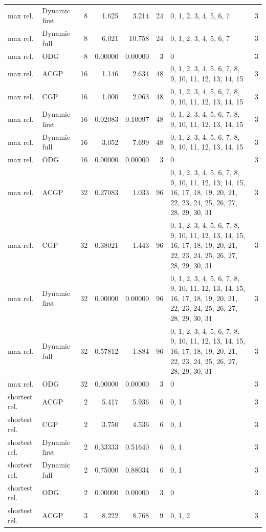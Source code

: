 \documentclass[10pt,a4paper]{article}
\begin{document}
\begin{longtable}{@{}p{23mm}p{29mm}rrrrp{36mm}r@{}}
max rel. & Dynamic first & 8 & 1.625 & 3.214 & 24 & 0, 1, 2, 3, 4, 5, 6, 7 & 3 \\
max rel. & Dynamic full & 8 & 6.021 & 10.758 & 24 & 0, 1, 2, 3, 4, 5, 6, 7 & 3 \\
max rel. & ODG & 8 & 0.00000 & 0.00000 & 3 & 0 & 3 \\
max rel. & ACGP & 16 & 1.146 & 2.634 & 48 & 0, 1, 2, 3, 4, 5, 6, 7, 8, 9, 10, 11, 12, 13, 14, 15 & 3 \\
max rel. & CGP & 16 & 1.000 & 2.063 & 48 & 0, 1, 2, 3, 4, 5, 6, 7, 8, 9, 10, 11, 12, 13, 14, 15 & 3 \\
max rel. & Dynamic first & 16 & 0.02083 & 0.10097 & 48 & 0, 1, 2, 3, 4, 5, 6, 7, 8, 9, 10, 11, 12, 13, 14, 15 & 3 \\
max rel. & Dynamic full & 16 & 3.052 & 7.699 & 48 & 0, 1, 2, 3, 4, 5, 6, 7, 8, 9, 10, 11, 12, 13, 14, 15 & 3 \\
max rel. & ODG & 16 & 0.00000 & 0.00000 & 3 & 0 & 3 \\
max rel. & ACGP & 32 & 0.27083 & 1.033 & 96 & 0, 1, 2, 3, 4, 5, 6, 7, 8, 9, 10, 11, 12, 13, 14, 15, 16, 17, 18, 19, 20, 21, 22, 23, 24, 25, 26, 27, 28, 29, 30, 31 & 3 \\
max rel. & CGP & 32 & 0.38021 & 1.443 & 96 & 0, 1, 2, 3, 4, 5, 6, 7, 8, 9, 10, 11, 12, 13, 14, 15, 16, 17, 18, 19, 20, 21, 22, 23, 24, 25, 26, 27, 28, 29, 30, 31 & 3 \\
max rel. & Dynamic first & 32 & 0.00000 & 0.00000 & 96 & 0, 1, 2, 3, 4, 5, 6, 7, 8, 9, 10, 11, 12, 13, 14, 15, 16, 17, 18, 19, 20, 21, 22, 23, 24, 25, 26, 27, 28, 29, 30, 31 & 3 \\
max rel. & Dynamic full & 32 & 0.57812 & 1.884 & 96 & 0, 1, 2, 3, 4, 5, 6, 7, 8, 9, 10, 11, 12, 13, 14, 15, 16, 17, 18, 19, 20, 21, 22, 23, 24, 25, 26, 27, 28, 29, 30, 31 & 3 \\
max rel. & ODG & 32 & 0.00000 & 0.00000 & 3 & 0 & 3 \\
shortest rel. & ACGP & 2 & 5.417 & 5.936 & 6 & 0, 1 & 3 \\
shortest rel. & CGP & 2 & 3.750 & 4.536 & 6 & 0, 1 & 3 \\
shortest rel. & Dynamic first & 2 & 0.33333 & 0.51640 & 6 & 0, 1 & 3 \\
shortest rel. & Dynamic full & 2 & 0.75000 & 0.88034 & 6 & 0, 1 & 3 \\
shortest rel. & ODG & 2 & 0.00000 & 0.00000 & 3 & 0 & 3 \\
shortest rel. & ACGP & 3 & 8.222 & 8.768 & 9 & 0, 1, 2 & 3 \\

\end{longtable}
\end{document}
